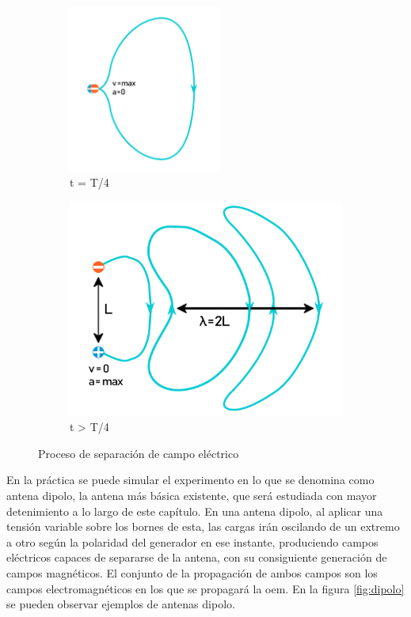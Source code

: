 \begin{figure}[h]
\begin{subfigure}[b]{0.3\textwidth}
		\label{fig:campo2}
	\end{subfigure}
	\begin{subfigure}[b]{0.3\textwidth} %
	\centering
		\includegraphics[width=5cm]{archivos/campos/campos3} %
		\caption{t = T/4}
		\label{fig:campo3}
	\end{subfigure}
	\begin{subfigure}[h]{0.5\textwidth} %
	\centering
	\includegraphics[width=10cm]{archivos/campos/campos4} %
	\caption{t > T/4}
	\label{fig:campo4}
\end{subfigure}
\caption{Proceso de separación de campo eléctrico}\label{sistemass}
\end{figure}

\par En la práctica se puede simular el experimento en lo que se denomina como antena dipolo, la antena más básica existente, que será estudiada con mayor detenimiento a lo largo de este capítulo. En una antena dipolo, al aplicar una tensión variable sobre los bornes de esta, las cargas irán oscilando de un extremo a otro según la polaridad del generador en ese instante, produciendo campos eléctricos capaces de separarse de la antena, con su consiguiente generación de campos magnéticos. El conjunto de la propagación de ambos campos son los campos electromagnéticos en los que se propagará la \gls{oem}. En la figura \ref{fig:dipolo} se pueden observar ejemplos de antenas dipolo. 

